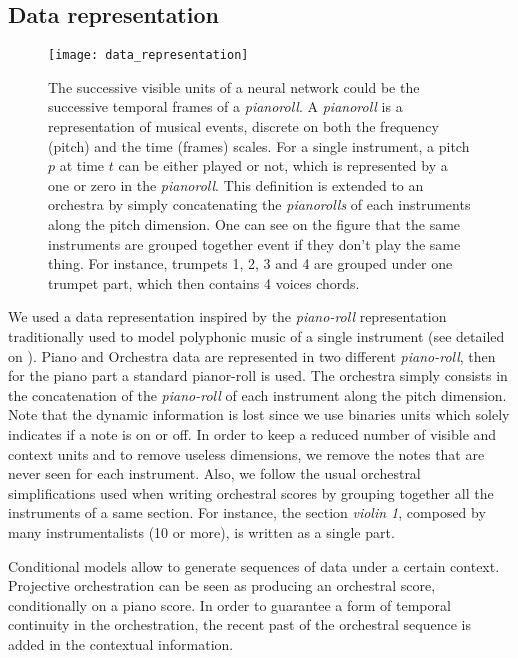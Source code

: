 \documentclass[letterpaper]{article}
\begin{document}
\subsection{Data representation}
\label{sec:data_representation}
\begin{figure}
\centering
\texttt{[image: data\_representation]}
\caption{The successive visible units of a neural network could be the successive temporal frames of a \textit{pianoroll}. A \textit{pianoroll} is a representation of musical events, discrete on both the frequency (pitch) and the time (frames) scales. For a single instrument, a pitch $p$ at time $t$ can be either played or not, which is represented by a one or zero in the \textit{pianoroll}. This definition is extended to an orchestra by simply concatenating the \textit{pianorolls} of each instruments along the pitch dimension. One can see on the figure that the same instruments are grouped together event if they don't play the same thing. For instance, trumpets 1, 2, 3 and 4 are grouped under one trumpet part, which then contains 4 voices chords.}
\label{fig:pianoroll}
\end{figure}
We used a data representation inspired by the \textit{piano-roll} representation traditionally used to model polyphonic music of a single instrument (see detailed on ). Piano and Orchestra data are represented in two different \textit{piano-roll}, then for the piano part a standard pianor-roll is used. The orchestra simply consists in the concatenation of the \textit{piano-roll} of each instrument along the pitch dimension. Note that the dynamic information is lost since we use binaries units which solely indicates if a note is on or off. In order to keep a reduced number of visible and context units and to remove useless dimensions, we remove the notes that are never seen for each instrument.
Also, we follow the usual orchestral simplifications used when writing orchestral scores by grouping together all the instruments of a same section. For instance, the section \textit{violin 1}, composed by many instrumentalists (10 or more), is written as a single part.

Conditional models allow to generate sequences of data under a certain context. Projective orchestration can be seen as producing an orchestral score, conditionally on a piano score. In order to guarantee a form of temporal continuity in the orchestration, the recent past of the orchestral sequence is added in the contextual information.
\end{document}
